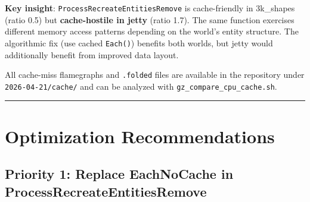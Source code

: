 \documentclass[11pt, a4paper]{article}
\begin{document}
\textbf{Key insight}: \texttt{ProcessRecreateEntitiesRemove} is cache-friendly in 3k\_shapes (ratio 0.5) but \textbf{cache-hostile in jetty} (ratio 1.7). The same function exercises different memory access patterns depending on the world's entity structure. The algorithmic fix (use cached \texttt{Each()}) benefits both worlds, but jetty would additionally benefit from improved data layout.

All cache-miss flamegraphs and \texttt{.folded} files are available in the repository under \texttt{2026-04-21/cache/} and can be analyzed with \texttt{gz\_compare\_cpu\_cache.sh}.

\begin{center}\rule{0.5\linewidth}{0.5pt}\end{center}

\hypertarget{optimization-recommendations-priority-ranked-gazebo-owned}{%
\section{Optimization Recommendations}\label{optimization-recommendations}}

\subsection{Priority 1: Replace EachNoCache in ProcessRecreateEntitiesRemove}
\end{document}
